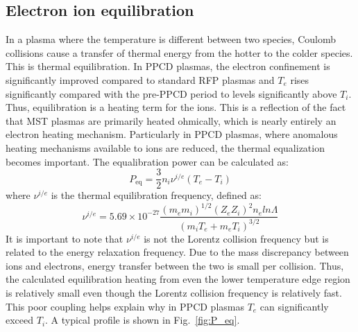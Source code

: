 \begin{refsection}
\subsection{Electron ion equilibration}\label{sec:equilibration_power}

In a plasma where the temperature is different between two species, Coulomb collisions cause a transfer of thermal energy from the hotter to the colder species. This is thermal equilibration. In PPCD plasmas, the electron confinement is significantly improved compared to standard RFP plasmas and $T_e$ rises significantly compared with the pre-PPCD period to levels significantly above $T_i$. Thus, equilibration is a heating term for the ions. This is a reflection of the fact that MST plasmas are primarily heated ohmically, which is nearly entirely an electron heating mechanism. Particularly in PPCD plasmas, where anomalous heating mechanisms available to ions are reduced, the thermal equalization becomes important. The equalibration power can be calculated as\cite{Braginskii1965}:
\begin{equation}
    P_{\text{eq}} = \frac{3}{2}n_i\nu^{i/e}(T_e - T_i)
\end{equation}
where $\nu^{i/e}$ is the thermal equilibration frequency, defined as\cite{Greene1973}:
\begin{equation}
    \nu^{i/e} = 5.69\times10^{-27}\frac{(m_e m_i)^{1/2}(Z_e Z_i)^{2} n_e ln \Lambda}{(m_iT_e + m_eT_i)^{3/2}}
\end{equation}
It is important to note that $\nu^{i/e}$ is not the Lorentz collision frequency but is related to the energy relaxation frequency. Due to the mass discrepancy between ions and electrons, energy transfer between the two is small per collision. Thus, the calculated equilibration heating from even the lower temperature edge region is relatively small even though the Lorentz collision frequency is relatively fast. This poor coupling helps explain why in PPCD plasmas $T_e$ can significantly exceed $T_i$. A typical profile is shown in Fig.~\ref{fig:P_eq}.


\end{refsection}
